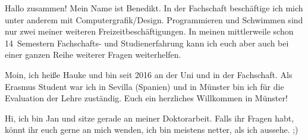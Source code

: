 \begin{multicols}{2}
{
Hallo zusammen! Mein Name ist Benedikt. In der Fachschaft beschäftige ich mich unter anderem mit Computergrafik/Design. 
Programmieren und Schwimmen sind nur zwei meiner weiteren Freizeitbeschäftigungen. 
In meinen mittlerweile schon 14~Semestern Fachschafts- und Studienerfahrung kann ich euch aber auch bei einer ganzen Reihe weiterer Fragen weiterhelfen.
}

\vspace{-0.5cm}

{
Moin, ich heiße Hauke und bin seit 2016 an der Uni und in der Fachschaft. Als Erasmus Student war ich in Sevilla (Spanien) und in Münster bin ich für die Evaluation der Lehre zuständig. 
Euch ein herzliches Willkommen in Münster!
}

\vspace{0.2cm}

{
Hi, ich bin Jan und sitze gerade an meiner Doktorarbeit. Falls ihr Fragen habt, könnt ihr euch gerne an mich wenden, ich bin meistens netter, als ich aussehe. ;)
}

\vspace{-0.1cm}


\end{multicols}
